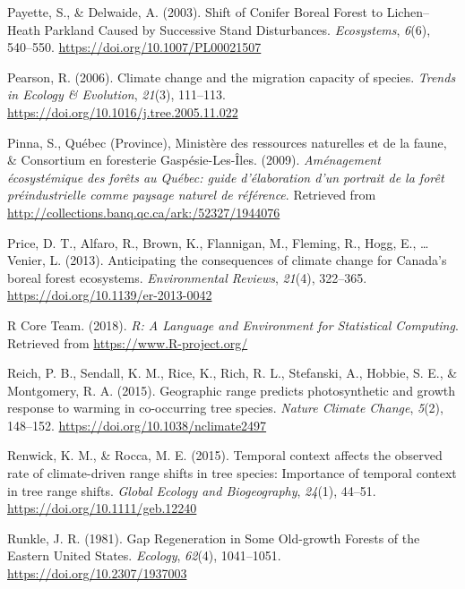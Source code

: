 \documentclass[a4paperpaper,]{article}
\begin{document}
\leavevmode\hypertarget{ref-payette_shift_2003}{}%
Payette, S., \& Delwaide, A. (2003). Shift of Conifer Boreal Forest to
Lichen--Heath Parkland Caused by Successive Stand Disturbances.
\emph{Ecosystems}, \emph{6}(6), 540--550.
\url{https://doi.org/10.1007/PL00021507}

\leavevmode\hypertarget{ref-pearson_climate_2006}{}%
Pearson, R. (2006). Climate change and the migration capacity of
species. \emph{Trends in Ecology \& Evolution}, \emph{21}(3), 111--113.
\url{https://doi.org/10.1016/j.tree.2005.11.022}

\leavevmode\hypertarget{ref-pinna_amenagement_2009}{}%
Pinna, S., Québec (Province), Ministère des ressources naturelles et de
la faune, \& Consortium en foresterie Gaspésie-Les-Îles. (2009).
\emph{Aménagement écosystémique des forêts au Québec: guide
d'élaboration d'un portrait de la forêt préindustrielle comme paysage
naturel de référence}. Retrieved from
\url{http://collections.banq.qc.ca/ark:/52327/1944076}

\leavevmode\hypertarget{ref-price_anticipating_2013}{}%
Price, D. T., Alfaro, R., Brown, K., Flannigan, M., Fleming, R., Hogg,
E., \ldots{} Venier, L. (2013). Anticipating the consequences of climate
change for Canada's boreal forest ecosystems. \emph{Environmental
Reviews}, \emph{21}(4), 322--365.
\url{https://doi.org/10.1139/er-2013-0042}

\leavevmode\hypertarget{ref-r_core_team_r_2018}{}%
R Core Team. (2018). \emph{R: A Language and Environment for Statistical
Computing}. Retrieved from \url{https://www.R-project.org/}

\leavevmode\hypertarget{ref-reich_geographic_2015}{}%
Reich, P. B., Sendall, K. M., Rice, K., Rich, R. L., Stefanski, A.,
Hobbie, S. E., \& Montgomery, R. A. (2015). Geographic range predicts
photosynthetic and growth response to warming in co-occurring tree
species. \emph{Nature Climate Change}, \emph{5}(2), 148--152.
\url{https://doi.org/10.1038/nclimate2497}

\leavevmode\hypertarget{ref-renwick_temporal_2015}{}%
Renwick, K. M., \& Rocca, M. E. (2015). Temporal context affects the
observed rate of climate-driven range shifts in tree species: Importance
of temporal context in tree range shifts. \emph{Global Ecology and
Biogeography}, \emph{24}(1), 44--51.
\url{https://doi.org/10.1111/geb.12240}

\leavevmode\hypertarget{ref-runkle_gap_1981}{}%
Runkle, J. R. (1981). Gap Regeneration in Some Old-growth Forests of the
Eastern United States. \emph{Ecology}, \emph{62}(4), 1041--1051.
\url{https://doi.org/10.2307/1937003}
\end{document}
